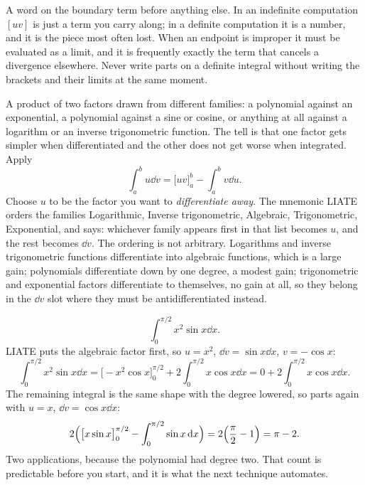 A word on the boundary term before anything else. In an indefinite computation $[uv]$ is just a term you carry along; in a definite computation it is a number, and it is the piece most often lost. When an endpoint is improper it must be evaluated as a limit, and it is frequently exactly the term that cancels a divergence elsewhere. Never write parts on a definite integral without writing the brackets and their limits at the same moment.

\cue A product of two factors drawn from different families: a polynomial against an exponential, a polynomial against a sine or cosine, or anything at all against a logarithm or an inverse trigonometric function. The tell is that one factor gets simpler when differentiated and the other does not get worse when integrated.
\method Apply
\[\int_a^b u\dd v=\bigl[uv\bigr]_a^b-\int_a^b v\dd u.\]
Choose $u$ to be the factor you want to \emph{differentiate away}. The mnemonic LIATE orders the families Logarithmic, Inverse trigonometric, Algebraic, Trigonometric, Exponential, and says: whichever family appears first in that list becomes $u$, and the rest becomes $\dd v$. The ordering is not arbitrary. Logarithms and inverse trigonometric functions differentiate into algebraic functions, which is a large gain; polynomials differentiate down by one degree, a modest gain; trigonometric and exponential factors differentiate to themselves, no gain at all, so they belong in the $\dd v$ slot where they must be antidifferentiated instead.

\begin{worked}
\[\int_0^{\pi/2}x^{2}\sin x\dd x.\]
LIATE puts the algebraic factor first, so $u=x^{2}$, $\dd v=\sin x\dd x$, $v=-\cos x$:
\[\int_0^{\pi/2}x^{2}\sin x\dd x=\bigl[-x^{2}\cos x\bigr]_0^{\pi/2}+2\int_0^{\pi/2}x\cos x\dd x=0+2\int_0^{\pi/2}x\cos x\dd x.\]
The remaining integral is the same shape with the degree lowered, so parts again with $u=x$, $\dd v=\cos x\dd x$:
\[2\Bigl(\bigl[x\sin x\bigr]_0^{\pi/2}-\int_0^{\pi/2}\sin x\,\mathrm{d} x\Bigr)=2\Bigl(\frac{\pi}{2}-1\Bigr)=\pi-2.\]
Two applications, because the polynomial had degree two. That count is predictable before you start, and it is what the next technique automates.
\end{worked}

